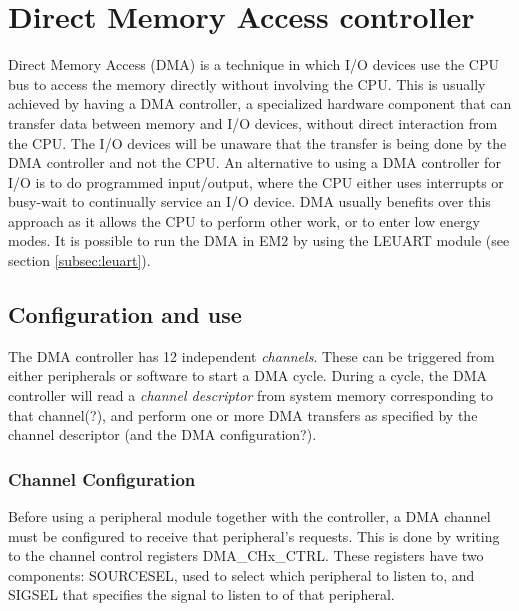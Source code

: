 

\section{Direct Memory Access controller}
Direct Memory Access (DMA) is a technique in which I/O devices use the CPU bus to access the memory directly without involving the CPU. 
This is usually achieved by having a DMA controller, a specialized hardware component that can transfer data between memory and I/O devices, without direct interaction from the CPU. The I/O devices will be unaware that the transfer is being done by the DMA controller and not the CPU. An alternative to using a DMA controller for I/O is to do programmed input/output, where the CPU either uses interrupts or busy-wait to continually service an I/O device. DMA usually benefits over this approach as it allows the CPU to perform other work, or to enter low energy modes.
It is possible to run the DMA in EM2 by using the LEUART module (see section \ref{subsec:leuart}).

\subsection{Configuration and use}
The DMA controller has 12 independent \emph{channels}. These can be triggered from either peripherals or software to start a DMA cycle. During a cycle, the DMA controller will read a \emph{channel descriptor} from system memory corresponding to that channel(?), and perform one or more DMA transfers as specified by the channel descriptor (and the DMA configuration?).

\subsubsection{Channel Configuration}
Before using a peripheral module together with the controller, a DMA channel must be configured to receive that peripheral's requests. This is done by writing to the channel control registers DMA\_CHx\_CTRL. These registers have two components: SOURCESEL, used to select which peripheral to listen to, and SIGSEL that specifies the signal to listen to of that peripheral.

